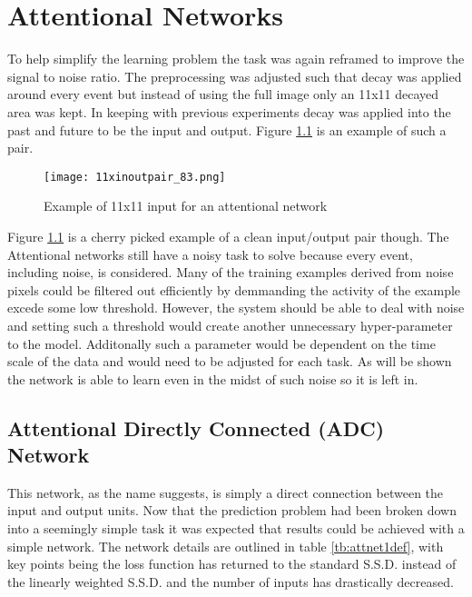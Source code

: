 \chapter{Attentional Networks}
\label{ch:attentional}
To help simplify the learning problem the task was again reframed to improve the signal to noise ratio.
The preprocessing was adjusted such that decay was applied around every event but instead of using the full image only an 11x11 decayed area was kept.
In keeping with previous experiments decay was applied into the past and future to be the input and output. 
Figure \ref{fig:11inoutpair} is an example of such a pair.

\begin{figure}[h]
    \centering
    \texttt{[image: 11xinoutpair\_83.png]}
    \caption{Example of 11x11 input for an attentional network}
    \label{fig:11inoutpair}
\end{figure}

Figure \ref{fig:11inoutpair} is a cherry picked example of a clean input/output pair though.
The Attentional networks still have a noisy task to solve because every event, including noise, is considered. 
Many of the training examples derived from noise pixels could be filtered out efficiently by demmanding the activity of the example excede some low threshold.
However, the system should be able to deal with noise and setting such a threshold would create another unnecessary hyper-parameter to the model.
Additonally such a parameter would be dependent on the time scale of the data and would need to be adjusted for each task. 
As will be shown the network is able to learn even in the midst of such noise so it is left in. 

\section{Attentional Directly Connected (ADC) Network}
This network, as the name suggests, is simply a direct connection between the input and output units.
Now that the prediction problem had been broken down into a seemingly simple task it was expected that results could be achieved with a simple network. 
The network details are outlined in table \ref{tb:attnet1def}, with key points being the loss function has returned to the standard S.S.D. instead of the linearly weighted S.S.D. and the number of inputs has drastically decreased. 

